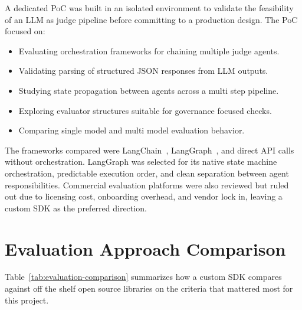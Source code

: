 \documentclass[12pt, a4paper, oneside]{report}
\begin{document}
A dedicated PoC was built in an isolated environment to validate the feasibility of an LLM as judge pipeline before committing to a production design. The PoC focused on:

\begin{itemize}
    \item Evaluating orchestration frameworks for chaining multiple judge agents.
    \item Validating parsing of structured JSON responses from LLM outputs.
    \item Studying state propagation between agents across a multi step pipeline.
    \item Exploring evaluator structures suitable for governance focused checks.
    \item Comparing single model and multi model evaluation behavior.
\end{itemize}

The frameworks compared were LangChain~\cite{langchain}, LangGraph~\cite{langgraph}, and direct API calls without orchestration. LangGraph was selected for its native state machine orchestration, predictable execution order, and clean separation between agent responsibilities. Commercial evaluation platforms were also reviewed but ruled out due to licensing cost, onboarding overhead, and vendor lock in, leaving a custom SDK as the preferred direction.

\section{Evaluation Approach Comparison}

Table~\ref{tab:evaluation-comparison} summarizes how a custom SDK compares against off the shelf open source libraries on the criteria that mattered most for this project.
\end{document}
